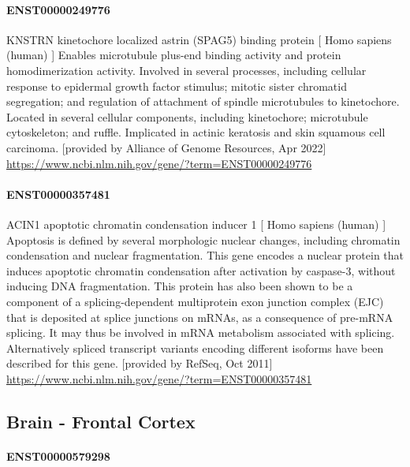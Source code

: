 \documentclass[
]{article}
\begin{document}
\hypertarget{enst00000249776}{%
\paragraph{ENST00000249776}\label{enst00000249776}}

KNSTRN kinetochore localized astrin (SPAG5) binding protein {[} Homo
sapiens (human) {]} Enables microtubule plus-end binding activity and
protein homodimerization activity. Involved in several processes,
including cellular response to epidermal growth factor stimulus; mitotic
sister chromatid segregation; and regulation of attachment of spindle
microtubules to kinetochore. Located in several cellular components,
including kinetochore; microtubule cytoskeleton; and ruffle. Implicated
in actinic keratosis and skin squamous cell carcinoma. {[}provided by
Alliance of Genome Resources, Apr 2022{]}
\url{https://www.ncbi.nlm.nih.gov/gene/?term=ENST00000249776}

\hypertarget{enst00000357481}{%
\paragraph{ENST00000357481}\label{enst00000357481}}

ACIN1 apoptotic chromatin condensation inducer 1 {[} Homo sapiens
(human) {]} Apoptosis is defined by several morphologic nuclear changes,
including chromatin condensation and nuclear fragmentation. This gene
encodes a nuclear protein that induces apoptotic chromatin condensation
after activation by caspase-3, without inducing DNA fragmentation. This
protein has also been shown to be a component of a splicing-dependent
multiprotein exon junction complex (EJC) that is deposited at splice
junctions on mRNAs, as a consequence of pre-mRNA splicing. It may thus
be involved in mRNA metabolism associated with splicing. Alternatively
spliced transcript variants encoding different isoforms have been
described for this gene. {[}provided by RefSeq, Oct 2011{]}
\url{https://www.ncbi.nlm.nih.gov/gene/?term=ENST00000357481}

\hypertarget{brain---frontal-cortex}{%
\subsection{Brain - Frontal Cortex}\label{brain---frontal-cortex}}

\hypertarget{enst00000579298}{%
\paragraph{ENST00000579298}\label{enst00000579298}}
\end{document}
